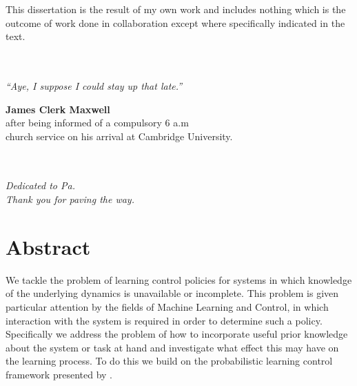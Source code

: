 \documentclass[a4paper,11pt,twoside,openright]{book}
\begin{document}
\frontmatter



\cleardoublepage

This dissertation is the result of my own work and includes nothing which is the outcome of work done in collaboration except where specifically indicated in the text.



\cleardoublepage

\thispagestyle{empty}
\begin{align*} &\; \\ &\; \\ &\; \\ &\;  \end{align*}

\begin{center}
\textit{``Aye, I suppose I could stay up that late.''} \\[1cm]
\end{center}
\begin{flushright}
{\bf James Clerk Maxwell} \\
after being informed of a compulsory 6 a.m \\church service on his arrival at Cambridge University.
\end{flushright} 


\cleardoublepage


\thispagestyle{empty}
\begin{align*} &\; \\ &\; \\ &\; \\ &\;  \end{align*}

\begin{center}
\textit{Dedicated to Pa.} \\
\textit{Thank you for paving the way.}
\end{center}





\chapter*{A\lowercase{bstract}}


We tackle the problem of learning control policies for systems in which knowledge of the underlying dynamics is unavailable or incomplete. This problem is given particular attention by the fields of Machine Learning and Control, in which interaction with the system is required in order to determine such a policy.
Specifically we address the problem of how to incorporate useful prior knowledge about the system or task at hand and investigate what effect this may have on the learning process. To do this we build on the probabilistic learning control framework presented by \cite{DR11}.
\end{document}
